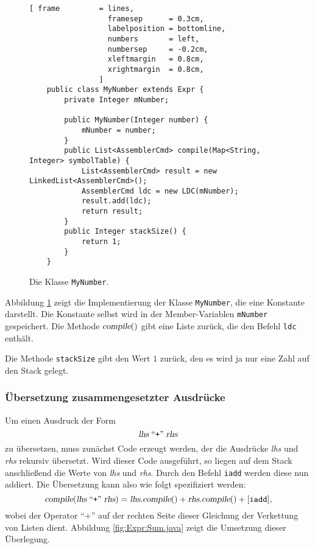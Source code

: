 \begin{figure}[!ht]
\centering
\begin{Verbatim}[ frame         = lines, 
                  framesep      = 0.3cm, 
                  labelposition = bottomline,
                  numbers       = left,
                  numbersep     = -0.2cm,
                  xleftmargin   = 0.8cm,
                  xrightmargin  = 0.8cm,
                ]
    public class MyNumber extends Expr {
        private Integer mNumber;
    
        public MyNumber(Integer number) {
            mNumber = number;
        }
        public List<AssemblerCmd> compile(Map<String, Integer> symbolTable) {
            List<AssemblerCmd> result = new LinkedList<AssemblerCmd>();
            AssemblerCmd ldc = new LDC(mNumber);
            result.add(ldc);
            return result;
        }
        public Integer stackSize() {
            return 1;
        }    
    }
\end{Verbatim}
\vspace*{-0.3cm}
\caption{Die Klasse \texttt{MyNumber}.}
\label{fig:Expr:MyNumber.java}
\end{figure}

Abbildung \ref{fig:Expr:MyNumber.java} zeigt die Implementierung der Klasse
\texttt{MyNumber}, die eine Konstante darstellt.  Die Konstante selbst wird in der 
Member-Variablen \texttt{mNumber} gespeichert.  
Die Methode $\textsl{compile}()$ gibt eine 
Liste zur\"uck, die den Befehl \texttt{ldc} enth\"alt.

Die Methode \texttt{stackSize} gibt  den Wert $1$ zur\"uck, den es wird ja nur eine Zahl auf den
Stack gelegt.

\subsubsection{\"Ubersetzung zusammengesetzter Ausdr\"ucke}
Um einen Ausdruck der Form
\[ \textsl{lhs} \;\mbox{``\texttt{+}''}\; \textsl{rhs} \]
zu \"ubersetzen, muss zun\"achst Code erzeugt werden, der die Ausdr\"ucke \textsl{lhs} und
\textsl{rhs} rekursiv \"ubersetzt.  Wird dieser Code ausgef\"uhrt, so liegen  auf dem Stack
anschlie{\ss}end die Werte von \textsl{lhs} und \textsl{rhs}.  Durch den Befehl \texttt{iadd} werden diese
nun addiert.  Die \"Ubersetzung kann also wie folgt spezifiziert werden:
\[ \textsl{compile}(\textsl{lhs} \;\mbox{``\texttt{+}''}\; \textsl{rhs}) = 
   \textsl{lhs}.\textsl{compile}() + \textsl{rhs}.\textsl{compile}() + [ \texttt{iadd} ],  
\]
wobei der Operator ``+'' auf der rechten Seite dieser Gleichung der Verkettung von Listen dient.  Abbildung
\ref{fig:Expr:Sum.java} zeigt die Umsetzung dieser \"Uberlegung.  

